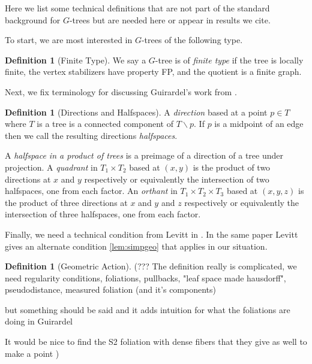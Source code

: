 \documentclass[12pt,parskip=full]{report}
\theoremstyle{plain}
\theoremstyle{definition}
\newtheorem{dfn}[thm]{Definition}
\begin{document}
Here we list some technical definitions that are not part of the standard background for \(G\)-trees but are needed here or appear in results we cite.

To start, we are most interested in \(G\)-trees of the following type.
\begin{dfn}
    [Finite Type]
    \label{defn:finitetype} 
    We say a $G$-tree is of \emph{finite type} if the tree is locally finite, the vertex stabilizers have property FP, and the quotient is a finite graph.
\end{dfn}

Next, we fix terminology for discussing Guirardel's work from \cite{guirardelcorepaper}.

\begin{dfn}
    [Directions and Halfspaces]
    \label{dfn:directionhalfspaces}
    A \emph{direction} based at a point \(p\in T\) where \(T\) is a tree is a connected component of \(T\smallsetminus p\). If \(p\) is a midpoint of an edge then we call the resulting directions \emph{halfspaces}.
    
    A \emph{halfspace in a product of trees} is a preimage of a direction of a tree under projection. A \emph{quadrant} in \(T_1\times T_2\) based at \((x,y)\) is the product of two directions at \(x\) and \(y\) respectively or equivalently the intersection of two halfspaces, one from each factor. An \emph{orthant} in \(T_1\times T_2\times T_3\) based at \((x,y,z)\) is the product of three directions at \(x\) and \(y\) and \(z\) respectively or equivalently the intersection of three halfspaces, one from each factor.
\end{dfn}

Finally, we need a technical condition from Levitt in \cite{levitt}. In the same paper Levitt gives an alternate condition \ref{lem:simpgeo} that applies in our situation.
 \begin{dfn}
     [Geometric Action]
     \label{defn:geometricaction}
      (??? The definition really is complicated, we need regularity conditions, foliations, pullbacks, "leaf space made hausdorff", pseudodistance, measured foliation (and it's components)
      
      but something should be said and it adds intuition for what the foliations are doing in Guirardel
      
      It would be nice to find the S2 foliation with dense fibers that they give as well to make a point
      )
 \end{dfn}
 
\end{document}
